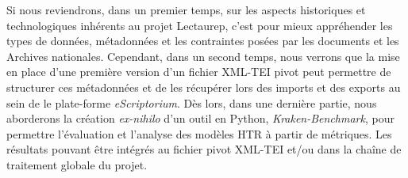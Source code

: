 Si nous reviendrons, dans un premier temps, sur les aspects historiques et technologiques inhérents au projet Lectaurep, c'est pour mieux appréhender les types de données, métadonnées et les contraintes posées par les documents et les Archives nationales. Cependant, dans un second temps, nous verrons que la mise en place d'une première version d'un fichier XML-TEI pivot peut permettre de structurer ces métadonnées et de les récupérer lors des imports et des exports au sein de le plate-forme \textit{eScriptorium}. Dès lors, dans une dernière partie, nous aborderons la création \textit{ex-nihilo} d'un outil en Python, \textit{Kraken-Benchmark}, pour permettre l'évaluation et l'analyse des modèles HTR à partir de métriques. Les résultats pouvant être intégrés au fichier pivot XML-TEI et/ou dans la chaîne de traitement globale du projet.

\newpage
\thispagestyle{empty}
